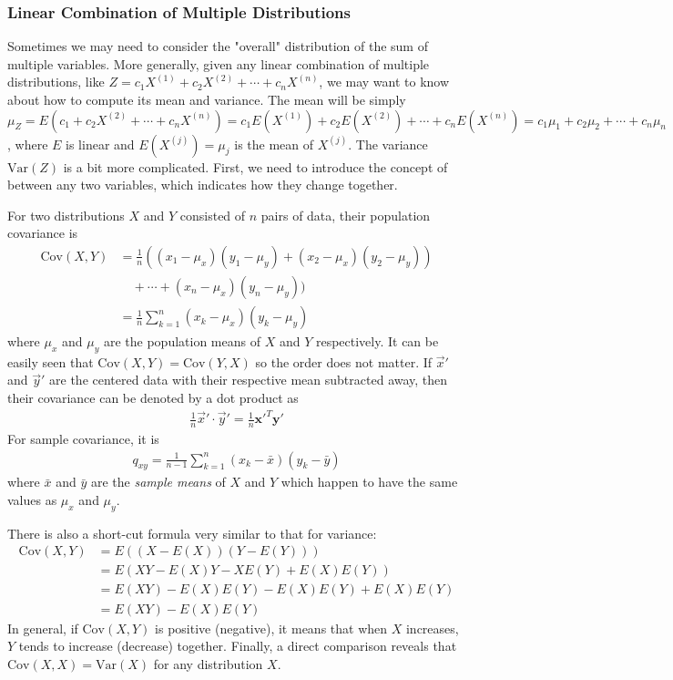 \subsubsection{Linear Combination of Multiple Distributions}
Sometimes we may need to consider the "overall" distribution of the sum of multiple variables. More generally, given any linear combination of multiple distributions, like $Z = c_1X^{(1)} + c_2X^{(2)} + \cdots + c_nX^{(n)}$, we may want to know about how to compute its mean and variance. The mean will be simply $\mu_Z = E(c_1 + c_2X^{(2)} + \cdots + c_nX^{(n)}) = c_1E(X^{(1)}) + c_2E(X^{(2)}) + \cdots + c_nE(X^{(n)}) = c_1\mu_1 + c_2\mu_2 + \cdots + c_n\mu_n$, where $E$ is linear and $E(X^{(j)}) = \mu_j$ is the mean of $X^{(j)}$. The variance $\text{Var}(Z)$ is a bit more complicated. First, we need to introduce the concept of  between any two variables, which indicates how they change together.
\begin{defn}
\label{defn:covariance}
For two distributions $X$ and $Y$ consisted of $n$ pairs of data, their population covariance is
\begin{align*}
\text{Cov}(X,Y) &= \frac{1}{n}((x_1-\mu_x)(y_1-\mu_y) + (x_2-\mu_x)(y_2-\mu_y)) \\
&\quad + \cdots + (x_n-\mu_x)(y_n-\mu_y)) \\
&= \frac{1}{n}\sum_{k=1}^{n} (x_k-\mu_x)(y_k-\mu_y)
\end{align*}
where $\mu_x$ and $\mu_y$ are the population means of $X$ and $Y$ respectively. It can be easily seen that $\text{Cov}(X,Y) = \text{Cov}(Y,X)$ so the order does not matter. If $\vec{x}'$ and $\vec{y}'$ are the centered data with their respective mean subtracted away, then their covariance can be denoted by a dot product as
\begin{align*}
\frac{1}{n} \vec{x}' \cdot \vec{y}' = \frac{1}{n} \textbf{x}'^T \textbf{y}'
\end{align*}
For sample covariance, it is
\begin{align*}
q_{xy} = \frac{1}{n-1} \sum_{k=1}^{n} (x_k-\bar{x})(y_k-\bar{y})
\end{align*}
where $\bar{x}$ and $\bar{y}$ are the \textit{sample means} of $X$ and $Y$ which happen to have the same values as $\mu_x$ and $\mu_y$.
\end{defn}
There is also a short-cut formula very similar to that for variance:
\begin{align*}
\text{Cov}(X,Y) &= E((X-E(X))(Y-E(Y))) \\
&= E(XY - E(X)Y - XE(Y) + E(X)E(Y)) \\
&= E(XY) - E(X)E(Y) - E(X)E(Y) + E(X)E(Y) \\
&= E(XY) - E(X)E(Y) 
\end{align*}
In general, if $\text{Cov}(X,Y)$ is positive (negative), it means that when $X$ increases, $Y$ tends to increase (decrease) together. Finally, a direct comparison reveals that $\text{Cov}(X,X) = \text{Var}(X)$ for any distribution $X$. 

